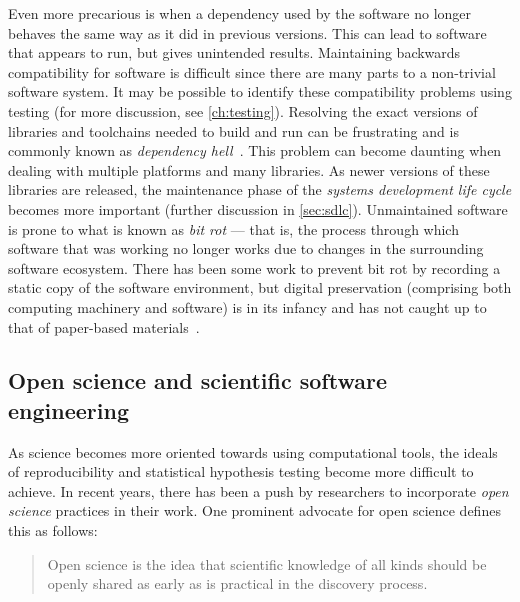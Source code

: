 { %
	Even more precarious is when a dependency used by the
	software no longer behaves the same way as it did in
	previous versions. This can lead to software that appears
	to run, but gives unintended results. Maintaining
	backwards compatibility for software is difficult since
	there are many parts to a non-trivial software system.
	It may be possible to identify these compatibility problems using
	testing (for more discussion, see \cref{ch:testing}).
	Resolving the exact versions of libraries and toolchains
	needed to build and run can be frustrating and is commonly
	known as \emph{dependency hell}~\autocite{anderson2000end,ModellingSoftDep:Burrows,Guo2011}.
	This problem can become
	daunting when dealing with multiple platforms and many
	libraries. As newer versions of these libraries are
	released, the maintenance phase of the \emph{systems
	development life cycle} becomes more important (further discussion in \cref{sec:sdlc}).
	Unmaintained software is prone to what is known as
	\emph{bit rot} --- that is, the process through which
	software that was working no longer works due to changes
	in the surrounding software ecosystem.
	There has been some work to prevent bit rot by recording a
	static copy of the software environment, but digital
	preservation (comprising both computing machinery and
	software) is in its infancy and has not caught up to that
	of paper-based materials~\autocite{PreservingExe2013,Thain2015,Meng2015}.
}


\subsection{Open science and scientific software engineering}\label{subsec:open-science}

As science becomes more oriented towards using computational
tools, the ideals of reproducibility and statistical hypothesis
testing become more difficult to achieve. In recent years, there
has been a push by researchers to incorporate \emph{open science}
practices in their work. One prominent advocate for open science
defines this as follows:\vspace{-3.5\parskip}
\begin{quote}
	\begin{fancyquote}
	Open science is the idea that scientific knowledge of all kinds
	should be openly shared as early as is practical in the discovery
	process.
	\end{fancyquote}
\end{quote}

